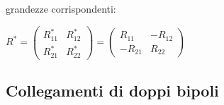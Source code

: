 \documentclass[a4paper]{article}
\begin{document}
\begin{center}
	\begin{minipage}{0.3\textwidth}
		\centering
		grandezze corrispondenti:
	\end{minipage}
	\begin{minipage}{0.4\textwidth}
		\centering
		\(R^* = \left(\begin{matrix} R_{11}^* & R_{12}^* \\ R_{21}^* & R_{22}^* \end{matrix}\right) = \left(\begin{matrix} R_{11} & -R_{12} \\ -R_{21} & R_{22} \end{matrix}\right)\)
	\end{minipage}
\end{center}

\subsection{Collegamenti di doppi bipoli}
\end{document}
